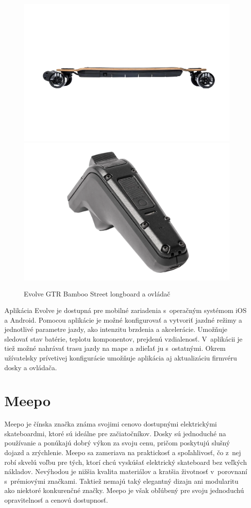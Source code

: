 \begin{figure}[h]
    \centering
    \includegraphics[width=0.48\linewidth]{figures/brand-reviews/evolve-longboard.png}\hfill
    \includegraphics[width=0.48\linewidth]{figures/brand-reviews/evolve-controller.png}
    \caption{Evolve GTR Bamboo Street longboard a ovládač\cite{Evolve}}\label{fig:evolve}
\end{figure}

Aplikácia Evolve je dostupná pre mobilné zariadenia s~operačným systémom iOS a Android.
Pomocou aplikácie je možné konfigurovať a vytvoriť jazdné režimy a jednotlivé parametre jazdy, ako intenzitu brzdenia a akcelerácie.
Umožňuje sledovať stav batérie, teplotu komponentov, prejdenú vzdialenosť.
V~aplikácii je tiež možné nahrávať trasu jazdy na mape a zdieľať ju s~ostatnými.
Okrem užívatelsky prívetivej konfigurácie umožňuje aplikácia aj aktualizáciu firmvéru dosky a ovládača.\cite{Evolve}

\section{Meepo}
Meepo je čínska značka známa svojimi cenovo dostupnými elektrickými skateboardmi, ktoré sú ideálne pre začiatočníkov. 
Dosky sú jednoduché na používanie a ponúkajú dobrý výkon za svoju cenu, pričom poskytujú slušný dojazd a zrýchlenie.
Meepo sa zameriava na praktickosť a spoľahlivosť, čo z~nej robí skvelú voľbu pre tých, ktorí chcú vyskúšať elektrický skateboard bez veľkých nákladov. 
Nevýhodou je nižšia kvalita materiálov a kratšia životnosť v~porovnaní s~prémiovými značkami. 
Taktiež nemajú taký elegantný dizajn ani modularitu ako niektoré konkurenčné značky. 
Meepo je však obľúbený pre svoju jednoduchú opravitelnosť a cenovú dostupnosť.

